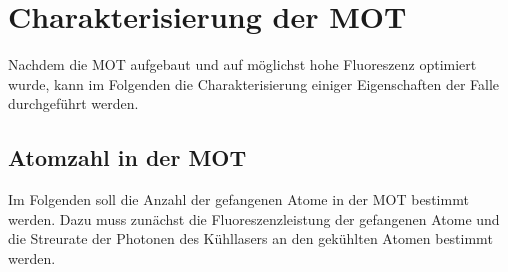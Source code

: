 \documentclass[11pt, a4paper]{article}
\numberwithin{equation}{section}
\begin{document}
\section{Charakterisierung der MOT}
\label{sec:charakterisierung_mot}
Nachdem die MOT aufgebaut und auf möglichst hohe Fluoreszenz optimiert wurde, kann im Folgenden die Charakterisierung einiger Eigenschaften der Falle durchgeführt werden.

\subsection{Atomzahl in der MOT}
Im Folgenden soll die Anzahl der gefangenen Atome in der MOT bestimmt werden.
Dazu muss zunächst die Fluoreszenzleistung der gefangenen Atome und die Streurate der Photonen des Kühllasers an den gekühlten Atomen bestimmt werden.
\end{document}

